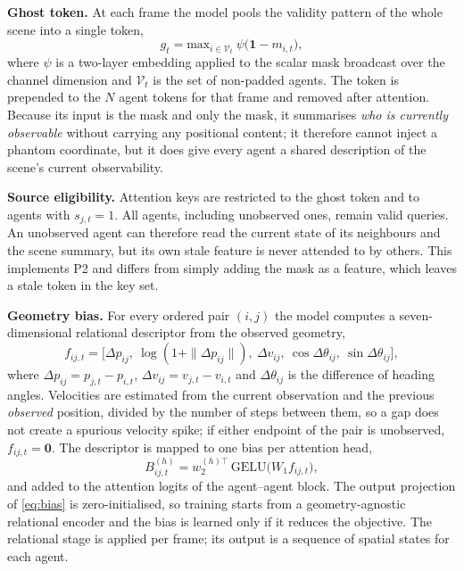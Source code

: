 \textbf{Ghost token.} At each frame the model pools the validity pattern of the whole scene into a single token,
\begin{equation}
g_{t}=\mathrm{max}_{i\in\mathcal{V}_{t}}\ \psi\big(\mathbf{1}-m_{i,t}\big),
\label{eq:ghost}
\end{equation}
where $\psi$ is a two-layer embedding applied to the scalar mask broadcast over the channel dimension and $\mathcal{V}_{t}$ is the set of non-padded agents. The token is prepended to the $N$ agent tokens for that frame and removed after attention. Because its input is the mask and only the mask, it summarises \emph{who is currently observable} without carrying any positional content; it therefore cannot inject a phantom coordinate, but it does give every agent a shared description of the scene's current observability.

\textbf{Source eligibility.} Attention keys are restricted to the ghost token and to agents with $s_{j,t}=1$. All agents, including unobserved ones, remain valid queries. An unobserved agent can therefore read the current state of its neighbours and the scene summary, but its own stale feature is never attended to by others. This implements P2 and differs from simply adding the mask as a feature, which leaves a stale token in the key set.

\textbf{Geometry bias.} For every ordered pair $(i,j)$ the model computes a seven-dimensional relational descriptor from the observed geometry,
\begin{equation}
f_{ij,t}=\big[\Delta p_{ij},\ \log(1+\|\Delta p_{ij}\|),\ \Delta v_{ij},\ \cos\Delta\theta_{ij},\ \sin\Delta\theta_{ij}\big],
\label{eq:geom}
\end{equation}
where $\Delta p_{ij}=p_{j,t}-p_{i,t}$, $\Delta v_{ij}=v_{j,t}-v_{i,t}$ and $\Delta\theta_{ij}$ is the difference of heading angles. Velocities are estimated from the current observation and the previous \emph{observed} position, divided by the number of steps between them, so a gap does not create a spurious velocity spike; if either endpoint of the pair is unobserved, $f_{ij,t}=\mathbf{0}$. The descriptor is mapped to one bias per attention head,
\begin{equation}
B_{ij,t}^{(h)}=w_{2}^{(h)\top}\,\mathrm{GELU}\big(W_{1}f_{ij,t}\big),
\label{eq:bias}
\end{equation}
and added to the attention logits of the agent--agent block. The output projection of \eqref{eq:bias} is zero-initialised, so training starts from a geometry-agnostic relational encoder and the bias is learned only if it reduces the objective. The relational stage is applied per frame; its output is a sequence of spatial states for each agent.


